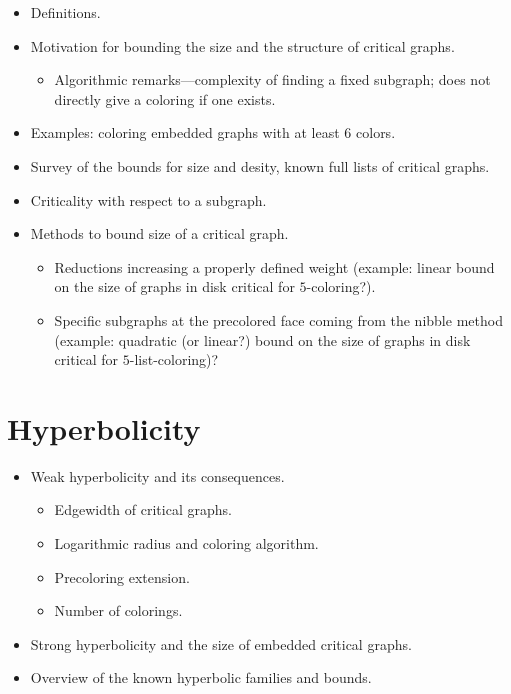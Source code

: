 \documentclass[12pt,twoside,openright,a4paper]{book}
\begin{document}
\begin{itemize}
\item Definitions.
\item Motivation for bounding the size and the structure of critical graphs.
\begin{itemize}
\item Algorithmic remarks---complexity of finding a fixed subgraph; does not directly
give a coloring if one exists.
\end{itemize}
\item Examples: coloring embedded graphs with at least $6$ colors.
\item Survey of the bounds for size and desity, known full lists of critical graphs.
\item Criticality with respect to a subgraph.
\item Methods to bound size of a critical graph.
\begin{itemize}
\item Reductions increasing a properly defined weight (example: linear bound on the size of graphs in disk
critical for $5$-coloring?).
\item Specific subgraphs at the precolored face coming from the nibble method (example: quadratic (or linear?) bound
on the size of graphs in disk critical for $5$-list-coloring)?
\end{itemize}
\end{itemize}
% 

\chapter{Hyperbolicity}
% 

\begin{itemize}
\item Weak hyperbolicity and its consequences.
\begin{itemize}
\item Edgewidth of critical graphs.
\item Logarithmic radius and coloring algorithm.
\item Precoloring extension.
\item Number of colorings.
\end{itemize}
\item Strong hyperbolicity and the size of embedded critical graphs.
\item Overview of the known hyperbolic families and bounds.
\end{itemize}
\end{document}
